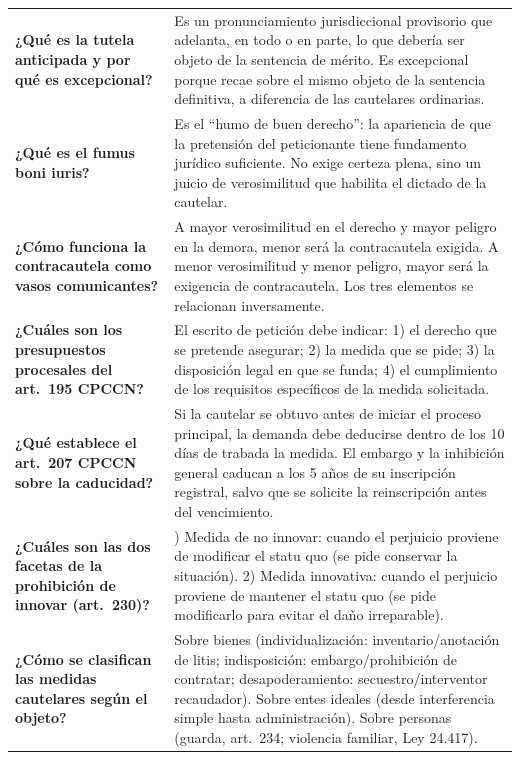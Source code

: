 \documentclass[12pt,oneside]{book}
\begin{document}
\begin{longtable}{
    >{\raggedright\arraybackslash}p{}
    >{\raggedright\arraybackslash}p{}
}
\textbf{¿Qué es la tutela anticipada y por qué es excepcional?} &
Es un pronunciamiento jurisdiccional provisorio que adelanta, en todo o en parte, lo que debería ser objeto de la sentencia de mérito. Es excepcional porque recae sobre el mismo objeto de la sentencia definitiva, a diferencia de las cautelares ordinarias. \\

\textbf{¿Qué es el fumus boni iuris?} &
Es el ``humo de buen derecho'': la apariencia de que la pretensión del peticionante tiene fundamento jurídico suficiente. No exige certeza plena, sino un juicio de verosimilitud que habilita el dictado de la cautelar. \\

\textbf{¿Cómo funciona la contracautela como vasos comunicantes?} &
A mayor verosimilitud en el derecho y mayor peligro en la demora, menor será la contracautela exigida. A menor verosimilitud y menor peligro, mayor será la exigencia de contracautela. Los tres elementos se relacionan inversamente. \\

\textbf{¿Cuáles son los presupuestos procesales del art.\ 195 CPCCN?} &
El escrito de petición debe indicar: 1) el derecho que se pretende asegurar; 2) la medida que se pide; 3) la disposición legal en que se funda; 4) el cumplimiento de los requisitos específicos de la medida solicitada. \\

\textbf{¿Qué establece el art.\ 207 CPCCN sobre la caducidad?} &
Si la cautelar se obtuvo antes de iniciar el proceso principal, la demanda debe deducirse dentro de los 10 días de trabada la medida. El embargo y la inhibición general caducan a los 5 años de su inscripción registral, salvo que se solicite la reinscripción antes del vencimiento. \\

\textbf{¿Cuáles son las dos facetas de la prohibición de innovar (art.\ 230)?} &
1) Medida de no innovar: cuando el perjuicio proviene de modificar el statu quo (se pide conservar la situación). 2) Medida innovativa: cuando el perjuicio proviene de mantener el statu quo (se pide modificarlo para evitar el daño irreparable). \\

\textbf{¿Cómo se clasifican las medidas cautelares según el objeto?} &
Sobre bienes (individualización: inventario/anotación de litis; indisposición: embargo/prohibición de contratar; desapoderamiento: secuestro/interventor recaudador). Sobre entes ideales (desde interferencia simple hasta administración). Sobre personas (guarda, art.\ 234; violencia familiar, Ley 24.417). \\


\end{longtable}
\end{document}
